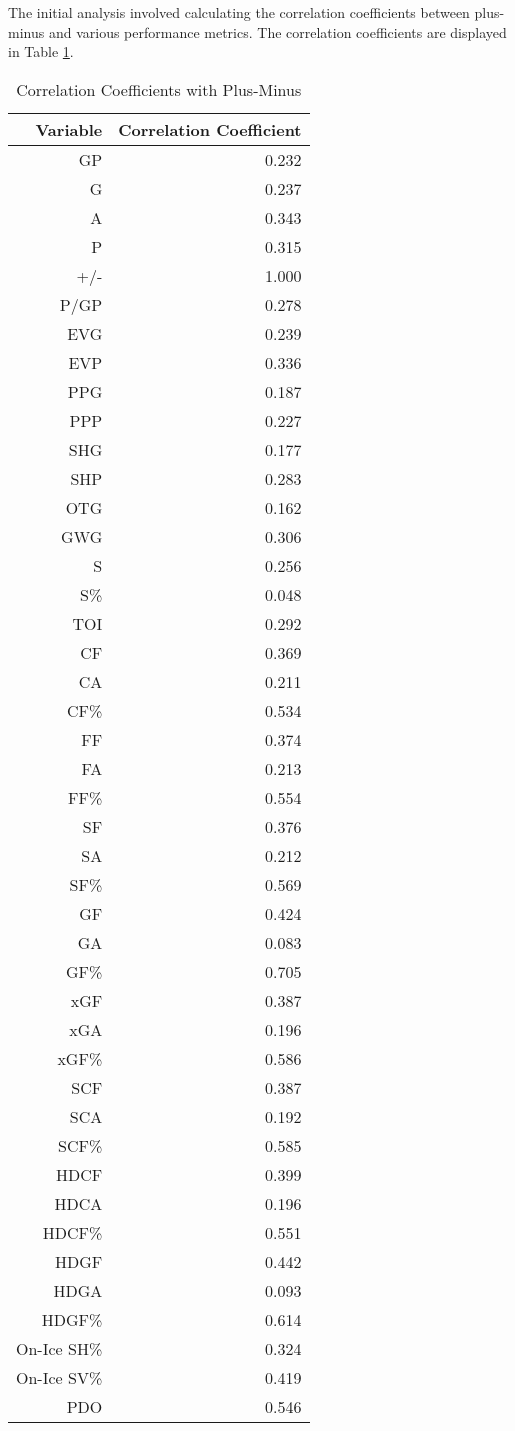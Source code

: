 \documentclass[12pt]{article}
\begin{document}
The initial analysis involved calculating the correlation coefficients between plus-minus and various performance metrics. The correlation 
coefficients are displayed in Table \ref{tab:rv1}.


\begin{table}[tbp]
  \caption{Correlation Coefficients with Plus-Minus}
  \label{tab:rv1}
\centering
\small
\begin{tabular}{rr}
  \toprule
Variable & Correlation Coefficient \\ 
  \midrule
  GP & 0.232 \\ 
  G & 0.237 \\ 
  A & 0.343 \\ 
  P & 0.315 \\ 
  +/- & 1.000 \\ 
  P/GP & 0.278 \\ 
  EVG & 0.239 \\ 
  EVP & 0.336 \\ 
  PPG & 0.187 \\ 
  PPP & 0.227 \\ 
  SHG & 0.177 \\ 
  SHP & 0.283 \\ 
  OTG & 0.162 \\ 
  GWG & 0.306 \\ 
  S & 0.256 \\ 
  S\% & 0.048 \\ 
  TOI & 0.292 \\ 
  CF & 0.369 \\ 
  CA & 0.211 \\ 
  CF\% & 0.534 \\ 
  FF & 0.374 \\ 
  FA & 0.213 \\ 
  FF\% & 0.554 \\ 
  SF & 0.376 \\ 
  SA & 0.212 \\ 
  SF\% & 0.569 \\ 
  GF & 0.424 \\ 
  GA & 0.083 \\ 
  GF\% & 0.705 \\ 
  xGF & 0.387 \\ 
  xGA & 0.196 \\ 
  xGF\% & 0.586 \\ 
  SCF & 0.387 \\ 
  SCA & 0.192 \\ 
  SCF\% & 0.585 \\ 
  HDCF & 0.399 \\ 
  HDCA & 0.196 \\ 
  HDCF\% & 0.551 \\ 
  HDGF & 0.442 \\ 
  HDGA & 0.093 \\ 
  HDGF\% & 0.614 \\ 
  On-Ice SH\% & 0.324 \\ 
  On-Ice SV\% & 0.419 \\ 
  PDO & 0.546 \\ 
  \bottomrule
\end{tabular}
\end{table}
\end{document}
